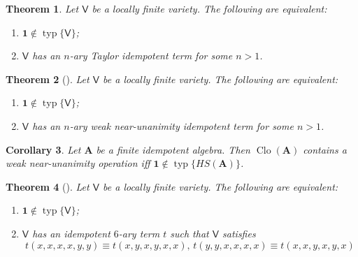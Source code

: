 \documentclass{amsart}
\theoremstyle{plain}
\newtheorem{theorem}{Theorem}[section]
\newtheorem{corollary}[theorem]{Corollary}
\theoremstyle{definition}
\theoremstyle{remark}
\DeclareMathOperator{\Clo}{Clo}
\DeclareMathOperator{\typ}{typ}
\begin{document}
\begin{theorem}
    Let $\mathsf{V}$ be a locally finite variety. The following are equivalent: 
    \begin{enumerate}
        \item $\mathbf{1} \notin \typ\{\mathsf{V}\}$; 
        \item $\mathsf{V}$ has an $n$-ary Taylor idempotent term for some $n >1$. 
    \end{enumerate}
\end{theorem}

\begin{theorem}
    [\cite{wnu}]
    Let $\mathsf{V}$ be a locally finite variety. The following are equivalent: 
    \begin{enumerate}
        \item $\mathbf{1} \notin \typ\{\mathsf{V}\}$; 
        \item $\mathsf{V}$ has an $n$-ary weak near-unanimity idempotent term for some $n >1$. 
    \end{enumerate}
\end{theorem}

\begin{corollary}
    Let $\mathbf{A}$ be a finite idempotent algebra. 
    Then $\Clo(\mathbf{A})$ contains a weak near-unanimity operation iff $\mathbf{1} \notin \typ\{HS(\mathbf{A})\}$. 
\end{corollary}

\begin{theorem}
    [\cite{siggers}]
    Let $\mathsf{V}$ be a locally finite variety.
    The following are equivalent: 
    \begin{enumerate}
        \item $\mathbf{1} \notin \typ\{\mathsf{V}\}$; 
        \item $\mathsf{V}$ has an idempotent $6$-ary term $t$ such that $\mathsf{V}$ satisfies 
    \begin{equation*}
        t(x,x,x,x,y,y) \equiv t(x,y,x,y,x,x) \text{, } t(y,y,x,x,x,x) \equiv t(x,x,y,x,y,x)
    \end{equation*}
    \end{enumerate}
\end{theorem}


\begin{center}
\begin{tikzpicture}
\end{tikzpicture}
\end{center} 
\end{document}
